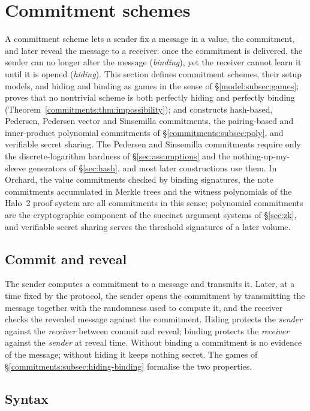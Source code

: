 \documentclass[11pt,a4paper]{article}
\theoremstyle{definition}
\theoremstyle{remark}
\begin{document}
\section{Commitment schemes}\label{sec:commitments}

A commitment scheme lets a sender fix a message in a value, the
commitment, and later reveal the message to a receiver: once the
commitment is delivered, the sender can no longer alter the message
(\emph{binding}), yet the receiver cannot learn it until it is opened
(\emph{hiding}). This section defines commitment schemes, their setup
models, and hiding and binding as games in the sense of
\S\ref{model:subsec:games}; proves that no nontrivial scheme is both
perfectly hiding and perfectly binding
(Theorem~\ref{commitments:thm:impossibility}); and constructs hash-based,
Pedersen, Pedersen vector and Sinsemilla commitments, the pairing-based
and inner-product polynomial commitments of
\S\ref{commitments:subsec:poly}, and verifiable secret sharing. The
Pedersen and Sinsemilla commitments require only the discrete-logarithm
hardness of \S\ref{sec:assumptions} and the nothing-up-my-sleeve
generators of \S\ref{sec:hash}, and most later constructions use them.
In Orchard, the value commitments checked by binding signatures, the note
commitments accumulated in Merkle trees and the witness polynomials of
the Halo~2 proof system are all commitments in this sense; polynomial
commitments are the cryptographic component of the succinct argument
systems of \S\ref{sec:zk}, and verifiable secret sharing serves the
threshold signatures of a later volume.

\subsection{Commit and reveal}\label{commitments:subsec:envelope}

The sender computes a commitment to a message and transmits it. Later,
at a time fixed by the protocol, the sender opens the commitment by
transmitting the message together with the randomness used to compute
it, and the receiver checks the revealed message against the commitment.
Hiding protects the \emph{sender} against the \emph{receiver} between
commit and reveal; binding protects the \emph{receiver} against the
\emph{sender} at reveal time. Without binding a commitment is no
evidence of the message; without hiding it keeps nothing secret. The
games of \S\ref{commitments:subsec:hiding-binding} formalise the two
properties.

\subsection{Syntax}\label{commitments:subsec:syntax}
\end{document}
